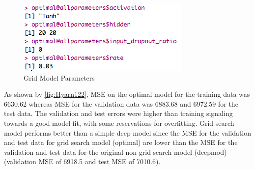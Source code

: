 \documentclass[12pt,twoside]{amherstthesis}
\begin{document}
  \begin{Shaded}
  \end{Shaded}
  
  \begin{figure}[htbp]
  \centering
  \includegraphics[scale = 0.7,angle = 0]{figure/optimalParam.png}
  \caption[Grid Model Parameters]{\normalsize{Grid Model Parameters}}
  \label{fig:Hyarn11}
  \end{figure}
  
  As shown by \autoref{fig:Hyarn122}, MSE on the optimal model for the
  training data was 6630.62 whereas MSE for the validation data was
  6883.68 and 6972.59 for the test data. The validation and test errors
  were higher than training signaling towards a good model fit, with some
  reservations for overfitting. Grid search model performs better than a
  simple deep model since the MSE for the validation and test data for
  grid search model (optimal) are lower than the MSE for the validation
  and test data for the original non-grid search model (deepmod)
  (validation MSE of 6918.5 and test MSE of 7010.6).
  
\end{document}

